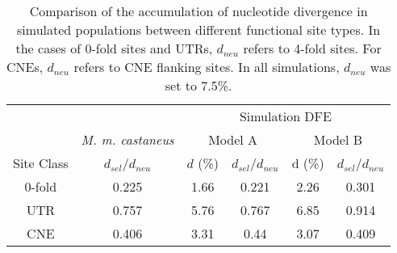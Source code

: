 \begin{table}[H]
\centering
\caption[Accumulation of divergence in simulated populations]{Comparison of the accumulation of nucleotide divergence in simulated populations between different functional site types. In the cases of 0-fold sites and UTRs, $d_{neu}$ refers to 4-fold sites. For CNEs, $d_{neu}$ refers to CNE flanking sites. In all simulations, $d_{neu}$ was set to 7.5\%.}

\begin{tabular}{cccccc}
\toprule
            & 							& \multicolumn{4}{c}{Simulation DFE}\\
            &  \textit{M. m. castaneus} &        \multicolumn{2}{c}{Model A}             &    \multicolumn{2}{c}{Model B} \\ \hdashline
 Site Class &       $d_{sel}$/$d_{neu}$ &          $d$ (\%) &  $d_{sel}$/$d_{neu}$ &      d (\%) &  $d_{sel}$/$d_{neu}$ \\ \midrule
     0-fold &           0.225           &           1.66 &      0.221 &       2.26 &      0.301 \\
        UTR &           0.757           &           5.76 &      0.767 &       6.85 &      0.914 \\
        CNE &           0.406           &           3.31 &       0.44 &       3.07 &      0.409 \\
\bottomrule
\end{tabular}
\label{tab:Divergence}
\end{table}